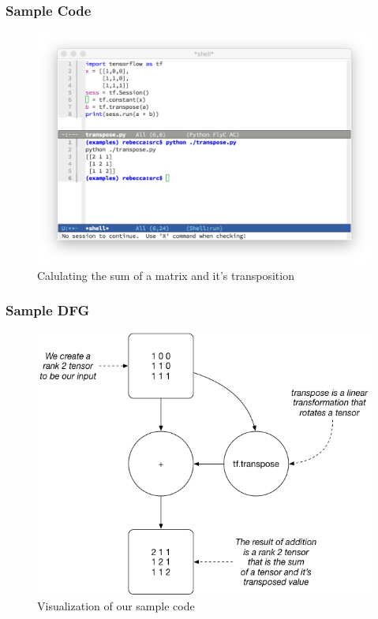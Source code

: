 \documentclass{beamer}
\begin{document}
\begin{frame}[fragile]
  \frametitle{Sample Code}

  \begin{figure}[fragile]
    \includegraphics[scale=.4]{img/transpose}
    \caption{Calulating the sum of a matrix and it's transposition}
  \end{figure}
\end{frame}

\begin{frame}[fragile]
  \frametitle{Sample DFG}

  \begin{figure}[fragile]
    \includegraphics[scale=.3]{img/full_dfg}
    \caption{Visualization of our sample code}
  \end{figure}
\end{frame}
\end{document}

